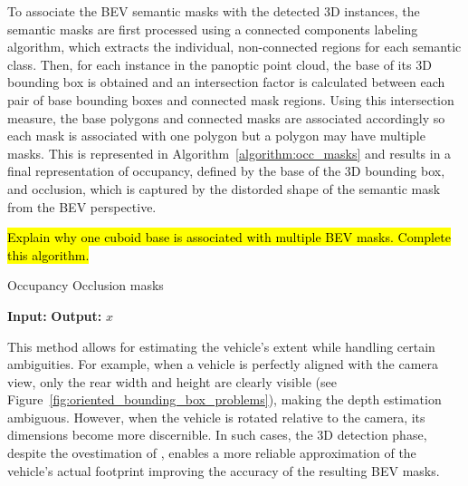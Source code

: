 To associate the BEV semantic masks with the detected 3D instances, the semantic masks are first processed using a connected components labeling algorithm, which extracts the individual, non-connected regions for each semantic class. Then, for each instance in the panoptic point cloud, the base of its 3D bounding box is obtained and an intersection factor is calculated between each pair of base bounding boxes and connected mask regions. Using this intersection measure, the base polygons and connected masks are associated accordingly so each mask is associated with one polygon but a polygon may have multiple masks. This is represented in Algorithm~\ref{algorithm:occ_masks} and results in a final representation of occupancy, defined by the base of the 3D bounding box, and occlusion, which is captured by the distorded shape of the semantic mask from the BEV perspective.

\hl{Explain why one cuboid base is associated with multiple BEV masks. Complete this algorithm.}
\begin{algorithm}
    \caption{Occupancy Occlusion masks}
    \label{algorithm:occ_masks}
    \footnotesize

    \begin{algorithmic}[1]
        \State \textbf{Input:} 
        \State \textbf{Output:} 
        \State \Return $x$
    \end{algorithmic}
\end{algorithm}

This method allows for estimating the vehicle’s extent while handling certain ambiguities. For example, when a vehicle is perfectly aligned with the camera view, only the rear width and height are clearly visible (see Figure~\ref{fig:oriented_bounding_box_problems}), making the depth estimation ambiguous. However, when the vehicle is rotated relative to the camera, its dimensions become more discernible. In such cases, the 3D detection phase, despite the ovestimation of , enables a more reliable approximation of the vehicle's actual footprint improving the accuracy of the resulting BEV masks.

